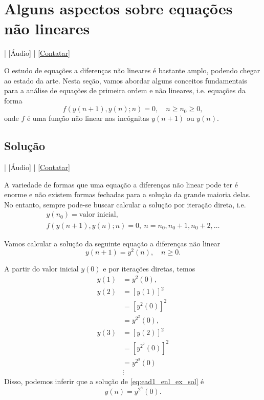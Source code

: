 \section{Alguns aspectos sobre equações não lineares}\label{cap_ead1_sec_eqnlin}

\begin{flushright}
  [Vídeo] | [Áudio] | \href{https://phkonzen.github.io/notas/contato.html}{[Contatar]}
\end{flushright}

O estudo de equações a diferenças não lineares é bastante amplo, podendo chegar ao estado da arte. Nesta seção, vamos abordar alguns conceitos fundamentais para a análise de equações de primeira ordem e não lineares, i.e. equações da forma
\begin{equation}\label{eq:ead1_enl}
  f\left(y(n+1),y(n);n\right)=0,\quad n\geq n_0\geq 0,
\end{equation}
onde $f$ é uma função não linear nas incógnitas $y(n+1)$ ou $y(n)$.

\subsection{Solução}

\begin{flushright}
  [Vídeo] | [Áudio] | \href{https://phkonzen.github.io/notas/contato.html}{[Contatar]}
\end{flushright}

A variedade de formas que uma equação a diferenças não linear pode ter é enorme e não existem formas fechadas para a solução da grande maioria delas. No entanto, sempre pode-se buscar calcular a solução por iteração direta, i.e.
\begin{gather}
  y(n_0) = \text{valor inicial},\\
  f\left(y(n+1),y(n);n\right)=0, ~ n= n_0, n_0+1, n_0+2, \ldots
\end{gather}

\begin{ex}
  Vamos calcular a solução da seguinte equação a diferenças não linear
  \begin{equation}\label{eq:ead1_enl_ex_sol}
    y(n+1) = y^2(n),\quad n\geq 0.
  \end{equation}

  A partir do valor inicial $y(0)$ e por iterações diretas, temos
  \begin{align}
    y(1) &= y^2(0),\\
    y(2) &= [y(1)]^2 \\
    &= \left[y^2(0)\right]^2 \\
    &= y^{2^2}(0),\\
    y(3) &= [y(2)]^2 \\
    &= \left[y^{2^2}(0)\right]^2 \\
    &= y^{2^3}(0) \\
    &\vdots
  \end{align}
  Disso, podemos inferir que a solução de \ref{eq:ead1_enl_ex_sol} é
  \begin{equation}
    y(n) = y^{2^n}(0).
  \end{equation}
\end{ex}

